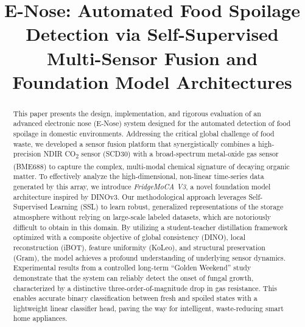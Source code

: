 \documentclass[conference]{IEEEtran}
\begin{document}
    \title{E-Nose: Automated Food Spoilage Detection via Self-Supervised Multi-Sensor Fusion and Foundation Model Architectures}

    \author{
        \and
    }

    \maketitle

    \begin{abstract}
        This paper presents the design, implementation, and rigorous evaluation of an advanced electronic nose (E-Nose) system designed for the automated detection of food spoilage in domestic environments. Addressing the critical global challenge of food waste, we developed a sensor fusion platform that synergistically combines a high-precision NDIR CO\textsubscript{2} sensor (SCD30) with a broad-spectrum metal-oxide gas sensor (BME688) to capture the complex, multi-modal chemical signature of decaying organic matter. To effectively analyze the high-dimensional, non-linear time-series data generated by this array, we introduce \textit{FridgeMoCA V3}, a novel foundation model architecture inspired by DINOv3. Our methodological approach leverages Self-Supervised Learning (SSL) to learn robust, generalized representations of the storage atmosphere without relying on large-scale labeled datasets, which are notoriously difficult to obtain in this domain. By utilizing a student-teacher distillation framework optimized with a composite objective of global consistency (DINO), local reconstruction (iBOT), feature uniformity (KoLeo), and structural preservation (Gram), the model achieves a profound understanding of underlying sensor dynamics. Experimental results from a controlled long-term ``Golden Weekend'' study demonstrate that the system can reliably detect the onset of fungal growth, characterized by a distinctive three-order-of-magnitude drop in gas resistance. This enables accurate binary classification between fresh and spoiled states with a lightweight linear classifier head, paving the way for intelligent, waste-reducing smart home appliances.
    \end{abstract}
\end{document}
